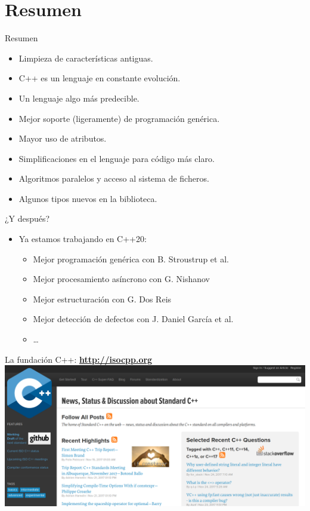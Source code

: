 \section{Resumen}

\begin{frame}[t]{Resumen}
\begin{itemize}[<+->]
  \item Limpieza de características antiguas.
  \item C++ es un lenguaje en constante evolución.
  \item Un lenguaje algo más predecible.
  \item Mejor soporte (ligeramente) de programación genérica.
  \item Mayor uso de atributos.
  \item Simplificaciones en el lenguaje para código más claro.
  \item Algoritmos paralelos y acceso al sistema de ficheros.
  \item Algunos tipos nuevos en la biblioteca.
\end{itemize}
\end{frame}

\begin{frame}[t]{¿Y después?}
\begin{itemize}
  \item Ya estamos trabajando en C++20:
    \begin{itemize}
      \item Mejor programación genérica con  {B. Stroustrup et al.}
      \item Mejor procesamiento asíncrono con  {G. Nishanov}
      \item Mejor estructuración con  {G. Dos Reis}
      \item Mejor detección de defectos con  {J. Daniel García et al.}
      \item \ldots
    \end{itemize}
\end{itemize}
\end{frame}

\begin{frame}[t]{La fundación C++: \textbf{\url{http://isocpp.org}}}
\includegraphics[width=\textwidth]{../img/isocpp.png}
\end{frame}

